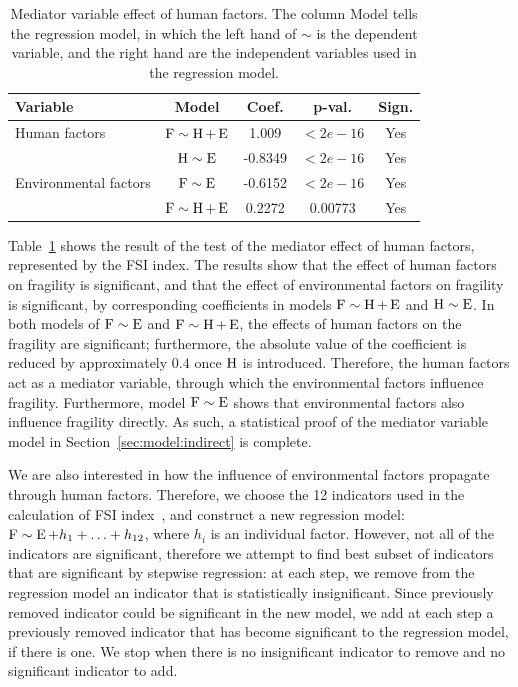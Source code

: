 {\begin{table}[htbp]
    \centering
    \begin{tabular}{|l|cccc|} \hline
        Variable & Model & Coef. & p-val. & Sign.  \\ \hline
        Human factors & $\operatorname*{F}\sim\operatorname*{{H}} + \operatorname*{E}$ & 1.009 & $<2e-16$ & Yes  \\ \hline        
        \multirow{3}{*}{Environmental factors} & $\operatorname*{{H}}\sim\operatorname*{E}$ & -0.8349 & $<2e-16$ & Yes \\ \cline{2-5}
        & $\operatorname*{F}\sim\operatorname*{E}$ & -0.6152 & $<2e-16$ & Yes \\ \cline{2-5}
        & $\operatorname*{F}\sim\operatorname*{{H}}+\operatorname*{E}$ & 0.2272 & 0.00773 & Yes \\ \hline        
    \end{tabular}
    \caption{Mediator variable effect of human factors. The column Model tells the regression model, in which the left hand of $\sim$ is the dependent variable, and the right hand are the independent variables used in the regression model.}
    \label{tab:exp:mediator:general}
\end{table}
    
Table~\ref{tab:exp:mediator:general} shows the result of the test of the mediator effect of human factors, represented by the FSI index. The results show that the effect of human factors on fragility is significant, and that the effect of environmental factors on fragility is significant, by corresponding coefficients in models $\operatorname*{F}\sim\operatorname*{{H}}+\operatorname*{E}$ and $\operatorname*{{H}}\sim\operatorname*{E}$. In both models of $\operatorname*{F}\sim\operatorname*{E}$ and $\operatorname*{F}\sim\operatorname*{{H}}+\operatorname*{E}$, the effects of human factors on the fragility are significant; furthermore, the absolute value of the coefficient is reduced by approximately $0.4$ once $\operatorname*{{H}}$ is introduced. Therefore, the human factors act as a mediator variable, through which the environmental factors influence fragility. Furthermore, model $\operatorname*{F}\sim\operatorname*{E}$ shows that environmental factors also influence fragility directly. As such, a statistical proof of the mediator variable model in Section~\ref{sec:model:indirect} is complete.

We are also interested in how the influence of environmental factors propagate through human factors. Therefore, we choose the 12 indicators used in the calculation of FSI index~\cite{FSI_index}, and construct a new regression model: $\operatorname*{F}\sim\operatorname*{E}+h_1+\ldots+h_{12}$, where $h_i$ is an individual factor. However, not all of the indicators are significant, therefore we attempt to find best subset of indicators that are significant by stepwise regression: at each step, we remove from the regression model an indicator that is statistically insignificant. Since previously removed indicator could be significant in the new model, we add at each step a previously removed indicator that has become significant to the regression model, if there is one. We stop when there is no insignificant indicator to remove and no significant indicator to add. 

}
